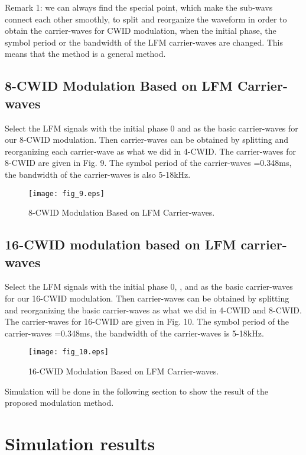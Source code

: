 \documentclass[journal]{IEEEtran}
\begin{document}
Remark 1: we can always find the special point, which make the
sub-wavs connect each other smoothly, to split and reorganize the
waveform in order to obtain the carrier-waves for CWID modulation,
when the initial phase, the symbol period or the bandwidth of the
LFM carrier-waves are changed. This means that the method is a
general method.
\subsection{8-CWID Modulation Based on LFM Carrier-waves}
Select the LFM signals with the initial phase 0 and  as the
basic carrier-waves for our 8-CWID modulation. Then carrier-waves
can be obtained by splitting and reorganizing each carrier-wave as
what we did in 4-CWID. The carrier-waves for 8-CWID are given in
Fig. 9. The symbol period of the carrier-waves =0.348ms, the
bandwidth of the carrier-waves is also 5-18kHz.
\begin{figure*}[!t]
\centering
\texttt{[image: fig\_9.eps]}
\caption{8-CWID Modulation Based on LFM Carrier-waves.}
\label{fig_sim}
\end{figure*}
\subsection{16-CWID modulation based on LFM carrier-waves}
Select the LFM signals with the initial phase 0, ,
 and  as the basic carrier-waves for our
16-CWID modulation. Then carrier-waves can be obtained by splitting
and reorganizing the basic carrier-waves as what we did in 4-CWID
and 8-CWID. The carrier-waves for 16-CWID are given in Fig. 10. The
symbol period of the carrier-waves =0.348ms, the bandwidth of the
carrier-waves is 5-18kHz.
\begin{figure*}[!t]
\centering
\texttt{[image: fig\_10.eps]}
\caption{16-CWID Modulation Based on LFM Carrier-waves.}
\label{fig_sim}
\end{figure*}

Simulation will be done in the following section to show the result
of the proposed modulation method.
\section{Simulation results}
\end{document}
